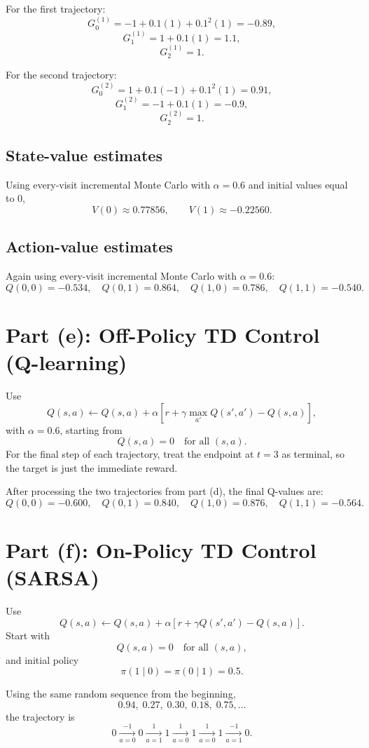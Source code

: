 \documentclass[11pt]{article}
\begin{document}
For the first trajectory:
\[
    G_0^{(1)}=-1+0.1(1)+0.1^2(1)=-0.89,
\]
\[
    G_1^{(1)}=1+0.1(1)=1.1,
\]
\[
    G_2^{(1)}=1.
\]

For the second trajectory:
\[
    G_0^{(2)}=1+0.1(-1)+0.1^2(1)=0.91,
\]
\[
    G_1^{(2)}=-1+0.1(1)=-0.9,
\]
\[
    G_2^{(2)}=1.
\]

\subsection*{State-value estimates}

Using every-visit incremental Monte Carlo with \(\alpha=0.6\) and initial values
equal to \(0\),
\[
    \boxed{
    V(0)\approx 0.77856,\qquad V(1)\approx -0.22560
    }.
\]

\subsection*{Action-value estimates}

Again using every-visit incremental Monte Carlo with \(\alpha=0.6\):
\[
    \boxed{
    Q(0,0)=-0.534,\quad
    Q(0,1)=0.864,\quad
    Q(1,0)=0.786,\quad
    Q(1,1)=-0.540
    }.
\]

\section*{Part (e): Off-Policy TD Control (Q-learning)}

Use
\[
    Q(s,a)\leftarrow Q(s,a)+\alpha\left[r+\gamma\max_{a'}Q(s',a')-Q(s,a)\right],
\]
with \(\alpha=0.6\), starting from
\[
    Q(s,a)=0
    \quad\text{for all }(s,a).
\]
For the final step of each trajectory, treat the endpoint at \(t=3\) as terminal, so
the target is just the immediate reward.

After processing the two trajectories from part (d), the final Q-values are:
\[
    \boxed{
    Q(0,0)=-0.600,\quad
    Q(0,1)=0.840,\quad
    Q(1,0)=0.876,\quad
    Q(1,1)=-0.564
    }.
\]

\section*{Part (f): On-Policy TD Control (SARSA)}

Use
\[
    Q(s,a)\leftarrow Q(s,a)+\alpha\left[r+\gamma Q(s',a')-Q(s,a)\right].
\]
Start with
\[
    Q(s,a)=0
    \quad\text{for all }(s,a),
\]
and initial policy
\[
    \pi(1\mid 0)=\pi(0\mid 1)=0.5.
\]

Using the same random sequence from the beginning,
\[
0.94,\;0.27,\;0.30,\;0.18,\;0.75,\ldots
\]
the trajectory is
\[
    0 \xrightarrow[a=0]{-1} 0
    \xrightarrow[a=1]{1} 1
    \xrightarrow[a=0]{1} 1
    \xrightarrow[a=0]{1} 1
    \xrightarrow[a=1]{-1} 0.
\]
\end{document}
